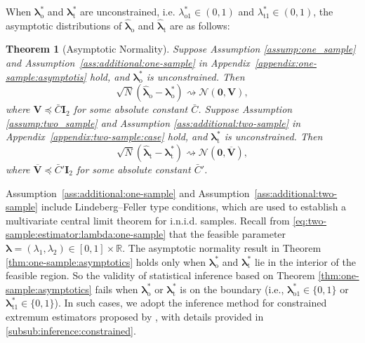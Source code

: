 \documentclass[12pt,letterpaper]{article}
\newtheorem{theorem}{Theorem}[section]
\begin{document}
\noindent When $\boldsymbol{\lambda}_{\mathrm{o}}^*$ and $\boldsymbol{\lambda}_{\mathrm{t}}^*$ are unconstrained, i.e. $\lambda_{\mathrm{o}1}^*\in(0,1)$ and $\lambda_{\mathrm{t}1}^*\in(0,1)$, the asymptotic distributions of $\hat{\boldsymbol{\lambda}}_{\mathrm{o}}$ and $\hat{\boldsymbol{\lambda}}_{\mathrm{t}}$ are as follows:
\begin{theorem}[Asymptotic Normality]\label{thm:asymptotics}
Suppose Assumption \ref{assump:one_sample} and Assumption~\ref{ass:additional:one-sample} in Appendix~\ref{appendix:one-sample:asymptotis} hold, and $\boldsymbol{\lambda}_{\mathrm{o}}^*$ is unconstrained. Then 
$$\sqrt{N}\left(\hat{\boldsymbol{\lambda}}_{\mathrm{o}}-\boldsymbol{\lambda}_{\mathrm{o}}^*\right)\rightsquigarrow\mathcal{N}(\mathbf{0},\mathbf{V}),$$ 
where $\mathbf{V}\preceq\bar{C}\mathbf{I}_2$ for some absolute constant $\bar{C}$. Suppose Assumption \ref{assump:two_sample} and Assumption \ref{ass:additional:two-sample} in Appendix~\ref{appendix:two-sample:case} hold, and $\boldsymbol{\lambda}_{\mathrm{t}}^*$ is unconstrained. Then 
$$\sqrt{N}\left(\hat{\boldsymbol{\lambda}}_{\mathrm{t}}-\boldsymbol{\lambda}_{\mathrm{t}}^*\right)\rightsquigarrow\mathcal{N}(\mathbf{0},\overline{\mathbf{V}}),$$ 
where $\overline{\mathbf{V}}\preceq\bar{C}'\mathbf{I}_2$ for some absolute constant $\bar{C}'$.   
\end{theorem}
Assumption~\ref{ass:additional:one-sample} and Assumption~\ref{ass:additional:two-sample} include Lindeberg–Feller type conditions, which are used to establish a multivariate central limit theorem for i.n.i.d. samples. Recall from \eqref{eq:two-sample:estimator:lambda:one-sample} that the feasible parameter $\boldsymbol{\lambda}=(\lambda_1,\lambda_2)\in[0,1]\times\mathbb{R}$. The asymptotic normality result in Theorem \ref{thm:one-sample:asymptotics} holds only when $\boldsymbol\lambda_{\mathrm{o}}^*$ and $\boldsymbol\lambda_{\mathrm{t}}^*$ lie in the interior of the feasible region. So the validity of statistical inference based on Theorem \ref{thm:one-sample:asymptotics} fails when $\boldsymbol\lambda_{\mathrm{o}}^*$ or $\boldsymbol\lambda_{\mathrm{t}}^*$ is on the boundary (i.e., $\boldsymbol{\lambda}_{\mathrm{o}1}^*\in\{0,1\}$ or $\boldsymbol{\lambda}_{\mathrm{t}1}^*\in\{0,1\}$). In such cases, we adopt the inference method for constrained extremum estimators proposed by \citet{li2024inference}, with details provided in \ref{subsub:inference:constrained}.
\end{document}

